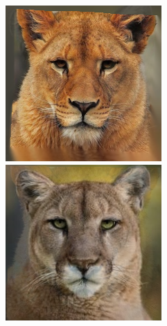 \documentclass[conference]{IEEEtran}
\begin{document}
\begin{figure}[H]
\begin{multicols}{3}
    \includegraphics[width=1.0\linewidth]{TestsCats/B/img10.png} \par
    \includegraphics[width=1.0\linewidth]{TestsCats/B/img40.png} \par


\end{multicols}
\end{figure}
\end{document}
